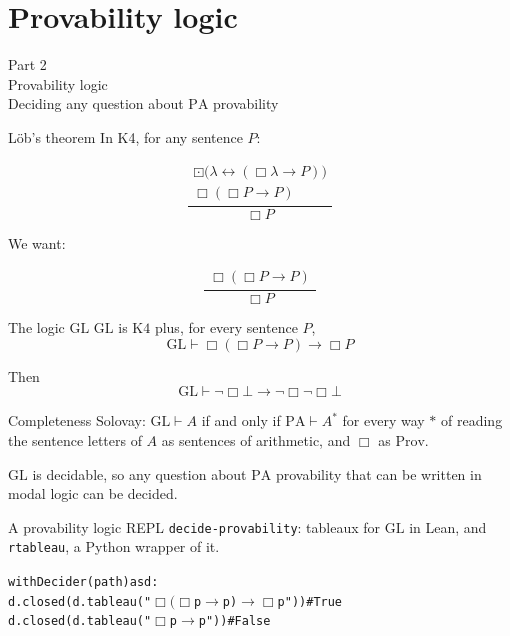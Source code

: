 \documentclass[
  ignorenonframetext,
]{beamer}
\newcommand{\Prov}{\mathrm{Prov}}
\newcommand{\PA}{\mathrm{PA}}
\newcommand{\KF}{\mathrm{K4}}
\newcommand{\GL}{\mathrm{GL}}
\newcommand{\rul}[2]{\frac{\begin{gathered}#1\end{gathered}}{#2}}
\begin{document}
\section{Provability logic}\label{provability-logic}

\begin{frame}{}
\protect{}\label{section-1}
\centering\Large Part 2\\[1ex] Provability logic\\[1ex]
\normalsize Deciding any question about $\PA$ provability
\end{frame}

\begin{frame}{Löb's theorem}
\protect{}\label{luxf6bs-theorem}
In K4, for any sentence \(P\):

\[ \rul{\boxdot\bigl(\lambda \leftrightarrow (\Box\lambda \to P)\bigr) \\ \Box(\Box P \to P)}{\Box P} \]

We want:

\[ \rul{\Box(\Box P \to P)}{\Box P} \]
\end{frame}

\begin{frame}{The logic \(\GL\)}
\protect{}\label{the-logic-gl}
\(\GL\) is \(\KF\) plus, for every sentence \(P\),
\[ \GL \vdash \Box(\Box P \to P) \to \Box P \]

\bigskip

Then \[ \GL \vdash \lnot\Box\bot \to \lnot\Box\lnot\Box\bot \]
\end{frame}

\begin{frame}{Completeness}
\protect{}\label{completeness}
Solovay: \(\GL \vdash A\) if and only if \(\PA \vdash A^*\) for every
way \(*\) of reading the sentence letters of \(A\) as sentences of
arithmetic, and \(\Box\) as \(\Prov\).

\bigskip

\(\GL\) is decidable, so any question about \(\PA\) provability that can
be written in modal logic can be decided.
\end{frame}

\begin{frame}[fragile]{A provability logic REPL}
\protect{}\label{a-provability-logic-repl}
\texttt{decide-provability}: tableaux for \(\GL\) in Lean, and
\texttt{rtableau}, a Python wrapper of it.

\bigskip

{\small\begin{alltt}
with Decider(path) as d:
        d.closed(d.tableau("\(\Box(\Box\)p \(\to\) p) \(\to\) \(\Box\)p"))  \# True
        d.closed(d.tableau("\(\Box\)p \(\to\) p"))  \# False
\end{alltt}}
\end{frame}
\end{document}
